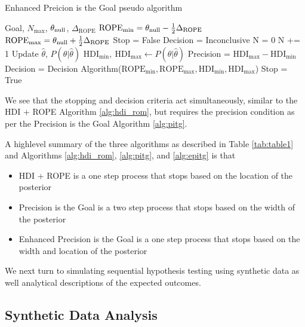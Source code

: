 \begin{algorithm}
    \caption{Enhanced Preicion is the Goal pseudo algorithm}\label{alg:epitg}
    \begin{algorithmic}
    \Require Goal, $N_\mathrm{max}$, $\theta_{\rm null}$, $\Delta_\mathrm{ROPE}$
    \State $\mathrm{ROPE}_\mathrm{min} = \theta_{\rm null} - \frac{1}{2}\Delta_\mathrm{ROPE}$
    \State $\mathrm{ROPE}_\mathrm{max} = \theta_{\rm null} + \frac{1}{2}\Delta_\mathrm{ROPE}$
    \State Stop = False
    \State Decision = Inconclusive
    \State N = 0
    \State N += 1  
    \State Update $\hat\theta$, $P(\theta|\hat\theta)$  
    \State $\mathrm{HDI}_\mathrm{min}, \ \mathrm{HDI}_\mathrm{max}  \gets P(\theta|\hat\theta)$ 
    \State Precision = $\mathrm{HDI}_\mathrm{max} - \mathrm{HDI}_\mathrm{min}$
        \State Decision = Decision Algorithm($\mathrm{ROPE}_\mathrm{min}, \mathrm{ROPE}_\mathrm{max}, \mathrm{HDI}_\mathrm{min}, \mathrm{HDI}_\mathrm{max}$) 
            \State \HiLi Stop = True 
        \EndIf
    \EndIf
    \EndWhile
    \end{algorithmic}
\end{algorithm}

We see that the stopping and decision criteria act simultaneously, similar to the HDI + ROPE Algorithm \ref{alg:hdi_rom},
but requires the precision condition as per the Precision is the Goal Algorithm \ref{alg:pitg}.

A highlevel summary of the three algorithms as described in Table \ref{tab:table1}
and Algorithms \ref{alg:hdi_rom}, \ref{alg:pitg}, and \ref{alg:epitg} is that

\begin{itemize}
    \item HDI + ROPE is a one step process that stops based on the location of the posterior
    \item Precision is the Goal is a two step process that stops based on the width of the posterior
    \item Enhanced Precision is the Goal is a one step process that stops based on the width and location of the posterior
\end{itemize}

We next turn to simulating sequential hypothesis testing using synthetic data as well
analytical descriptions of the expected outcomes.
\subsection{Synthetic Data Analysis}